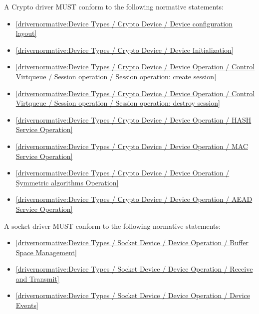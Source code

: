 \label{sec:Conformance / Driver Conformance / Crypto Driver Conformance}

A Crypto driver MUST conform to the following normative statements:

\begin{itemize}
\item \ref{drivernormative:Device Types / Crypto Device / Device configuration layout}
\item \ref{drivernormative:Device Types / Crypto Device / Device Initialization}
\item \ref{drivernormative:Device Types / Crypto Device / Device Operation / Control Virtqueue / Session operation / Session operation: create session}
\item \ref{drivernormative:Device Types / Crypto Device / Device Operation / Control Virtqueue / Session operation / Session operation: destroy session}
\item \ref{drivernormative:Device Types / Crypto Device / Device Operation / HASH Service Operation}
\item \ref{drivernormative:Device Types / Crypto Device / Device Operation / MAC Service Operation}
\item \ref{drivernormative:Device Types / Crypto Device / Device Operation / Symmetric algorithms Operation}
\item \ref{drivernormative:Device Types / Crypto Device / Device Operation / AEAD Service Operation}
\end{itemize}

\label{sec:Conformance / Driver Conformance / Socket Driver Conformance}

A socket driver MUST conform to the following normative statements:

\begin{itemize}
\item \ref{drivernormative:Device Types / Socket Device / Device Operation / Buffer Space Management}
\item \ref{drivernormative:Device Types / Socket Device / Device Operation / Receive and Transmit}
\item \ref{drivernormative:Device Types / Socket Device / Device Operation / Device Events}
\end{itemize}

